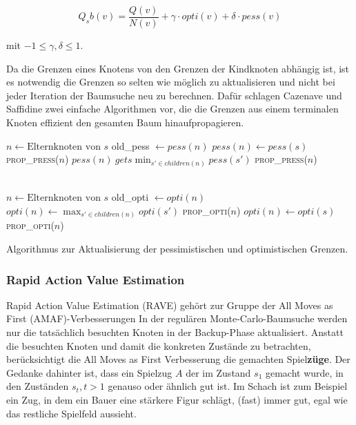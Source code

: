\begin{equation}
Q_sb(v) = \frac{Q(v)}{N(v)} + \gamma \cdot opti(v) + \delta \cdot pess(v)
\label{eqn:scorebound}
\end{equation}

mit $-1 \le \gamma, \delta \le 1$.

Da die Grenzen eines Knotens von den Grenzen der Kindknoten abhängig ist, ist es notwendig die Grenzen so selten wie möglich zu aktualisieren und nicht bei jeder Iteration der Baumsuche neu zu berechnen.
Dafür schlagen Cazenave und Saffidine zwei einfache Algorithmen vor, die die Grenzen aus einem terminalen Knoten effizient den gesamten Baum hinaufpropagieren.


\begin{algorithm}[H]
\begin{algorithmic}
		\State $n \gets \text{Elternknoten von }s$
		\State old\_pess $\gets pess(n)$
				\State $pess(n) \gets pess(s)$
				\State \textsc{prop\_press}($n$)
			\Else
				\State $pess(n) \ gets \min_{s' \in children(n)}pess(s')$
					\State \textsc{prop\_press}($n$)
				\EndIf
			\EndIf
		\EndIf
	\EndIf
\EndFunction

\\
		\State $n \gets \text{Elternknoten von }s$
		\State old\_opti $\gets opti(n)$
				\State $opti(n) \gets \max_{s' \in children(n)}opti(s')$
					\State \textsc{prop\_opti}($n$)
				\EndIf
			\Else
				\State $opti(n) \gets opti(s)$
				\State \textsc{prop\_opti}($n$)
			\EndIf
		\EndIf
	\EndIf
\EndFunction
\end{algorithmic}
\caption{Algorithmus zur Aktualisierung der pessimistischen und optimistischen Grenzen.\footnotemark}
\label{algo:prop-scorebound}
\end{algorithm}

\subsubsection{Rapid Action Value Estimation}

Rapid Action Value Estimation (RAVE) gehört zur Gruppe der All Moves as First (AMAF)-Verbesserungen
In der regulären Monte-Carlo-Baumsuche werden nur die tatsächlich besuchten Knoten in der Backup-Phase aktualisiert.
Anstatt die besuchten Knoten und damit die konkreten Zustände zu betrachten, berücksichtigt die All Moves as First Verbesserung die gemachten Spiel\textbf{züge}. Der Gedanke dahinter ist, dass ein Spielzug $A$ der im Zustand $s_1$ gemacht wurde, in den Zuständen $s_t, t > 1$ genauso oder ähnlich gut ist. Im Schach ist zum Beispiel ein Zug, in dem ein Bauer eine stärkere Figur schlägt, (fast) immer gut, egal wie das restliche Spielfeld aussieht.\autocite{helmboldAllMovesAsFirstHeuristicsMonteCarlo}

